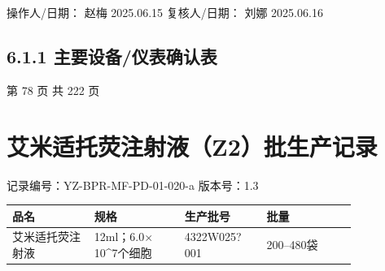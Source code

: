 \documentclass[UTF8,10pt,a4paper,fontset=fandol]{ctexart}
\newcommand{\fieldvalue}[1]{#1}
\newcommand{\handwritten}[1]{#1}
\begin{document}
\noindent
操作人/日期：
\fieldvalue{\handwritten{赵梅}}
\quad
\fieldvalue{\handwritten{2025.06.15}}
\hfill
复核人/日期：
\fieldvalue{\handwritten{刘娜}}
\quad
\fieldvalue{\handwritten{2025.06.16}}

\subsection*{6.1.1 主要设备/仪表确认表}

\begin{center}
第 78 页 共 222 页
\end{center}

\newpage

\section*{艾米适托荧注射液（Z2）批生产记录}

\noindent
记录编号：YZ-BPR-MF-PD-01-020-a \qquad 版本号：1.3

\begin{center}
\begin{tabular}{|p{0.20\linewidth}|p{0.22\linewidth}|p{0.20\linewidth}|p{0.22\linewidth}}
\hline
品名 & 规格 & 生产批号 & 批量\\
\hline
\fieldvalue{艾米适托荧注射液} &
\fieldvalue{12ml；6.0$\times$10^{7}个细胞} &
\fieldvalue{\handwritten{4322W025?001}} &
\fieldvalue{200--480袋}\\
\hline
\end{tabular}
\end{center}
\end{document}
